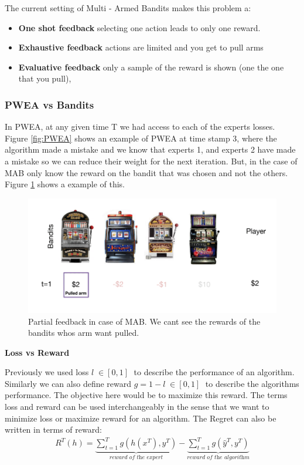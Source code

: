 \documentclass[11pt]{article}
\begin{document}
The current setting of Multi - Armed Bandits makes this problem a:
\begin{itemize}
    \item \textbf{One shot feedback} selecting one action leads to only one reward.
    \item \textbf{Exhaustive feedback} actions are limited and you get to pull arms
    \item \textbf{Evaluative feedback} only a sample of the reward is shown (one the one that you pull),
\end{itemize}
\subsubsection{PWEA vs Bandits}

In PWEA, at any given time T we had access to each of the experts losses. Figure \ref{fig:PWEA} shows an example of PWEA at time stamp 3, where the algorithm made a mistake and we know that experts 1, and experts 2 have made a mistake so we can reduce their weight for the next iteration. But, in the case of MAB only know the reward on the bandit that was chosen and not the others. Figure \ref{fig:partial_feed} shows a example of this.

\begin{figure}
    \centering
    \includegraphics[width=0.75\linewidth]{images/partial_fedback.png}
    \caption{Partial feedback in case of MAB. We cant see the rewards of the bandits whos arm want pulled.}
    \label{fig:partial_feed}
\end{figure}

\textbf{Loss vs Reward} 

Previously we used loss $l \; \in [0,1] \;$ to describe the performance of an algorithm. Similarly we can also define reward $g = 1 - l \; \in [0,1] \;$ to describe the algorithms performance. The objective here would be to maximize this reward. The terms loss and reward can be used interchangeably in the sense that we want to minimize loss or maximize reward for an algorithm. The Regret can also be written in terms of reward:
\begin{align*}
    R^{T}(h) = \underbrace{\sum_{t=1}^{T}g(h(x^T), y^T)}_{\textit{reward of the expert}}-\underbrace{\sum_{t=1}^{T}g(\hat{y}^T, y^T)}_{\textit{reward of the algorithm}}
\end{align*}
\end{document}
